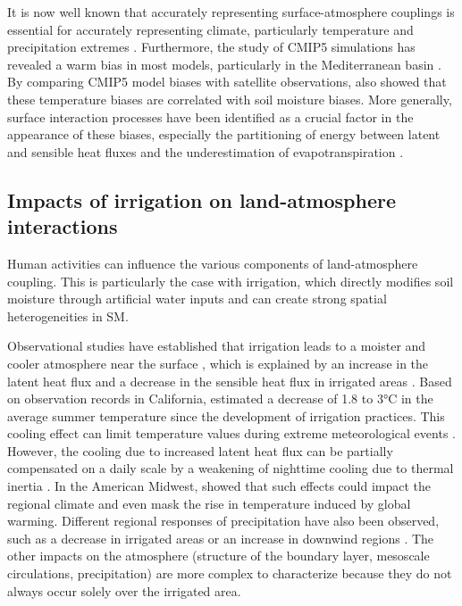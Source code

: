 It is now well known that accurately representing surface-atmosphere couplings is essential for accurately representing climate, particularly temperature and precipitation extremes \citep{jaeger_impact_2011, van_den_hurk_acceleration_2011}. Furthermore, the study of CMIP5 simulations has revealed a warm bias in most models, particularly in the Mediterranean basin \citep{christensen_temperature_2012, mueller_systematic_2014}. By comparing CMIP5 model biases with satellite observations, \citet{al-yaari_satellite-based_2019} also showed that these temperature biases are correlated with soil moisture biases. More generally, surface interaction processes have been identified as a crucial factor in the appearance of these biases, especially the partitioning of energy between latent and sensible heat fluxes and the underestimation of evapotranspiration \citep{cheruy_combined_2013, cheruy_role_2014}. 

\subsection{Impacts of irrigation on land-atmosphere interactions}

Human activities can influence the various components of land-atmosphere coupling. This is particularly the case with irrigation, which directly modifies soil moisture through artificial water inputs and can create strong spatial heterogeneities in SM. 

Observational studies have established that irrigation leads to a moister and cooler atmosphere near the surface \citep{bonfils_empirical_2007, mcdermid_irrigation_2023}, which is explained by an increase in the latent heat flux and a decrease in the sensible heat flux in irrigated areas \citep{rappin_landatmosphere_2022, boone_land_2025}.
Based on observation records in California, \citet{bonfils_empirical_2007} estimated a decrease of 1.8 to 3°C in the average summer temperature since the development of irrigation practices. This cooling effect can limit temperature values during extreme meteorological events \citep{thiery_present-day_2017, thiery_warming_2020}. However, the cooling due to increased latent heat flux can be partially compensated on a daily scale by a weakening of nighttime cooling due to thermal inertia \citep{chen_irrigation_2018}.
In the American Midwest, \cite{nocco_observation_2019} showed that such effects could impact the regional climate and even mask the rise in temperature induced by global warming. Different regional responses of precipitation have also been observed, such as a decrease in irrigated areas \citep{alter_rainfall_2015} or an increase in downwind regions \citep{deangelis_evidence_2010}.
The other impacts on the atmosphere (structure of the boundary layer, mesoscale circulations, precipitation) are more complex to characterize because they do not always occur solely over the irrigated area.

